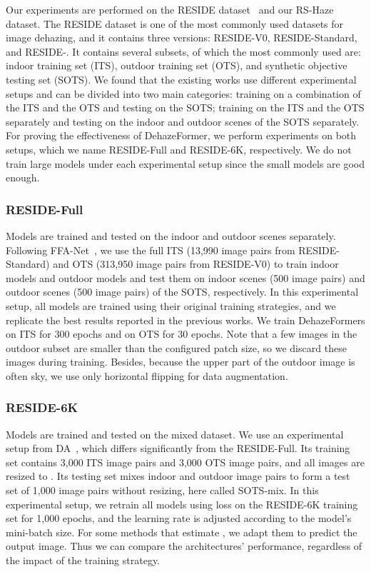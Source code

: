 \documentclass[journal]{IEEEtran}
\begin{document}
Our experiments are performed on the RESIDE dataset~\cite{li2018benchmarking} and our RS-Haze dataset.
The RESIDE dataset is one of the most commonly used datasets for image dehazing, and it contains three versions: RESIDE-V0, RESIDE-Standard, and RESIDE-.
It contains several subsets, of which the most commonly used are: indoor training set (ITS), outdoor training set (OTS), and synthetic objective testing set (SOTS).
We found that the existing works use different experimental setups and can be divided into two main categories: training on a combination of the ITS and the OTS and testing on the SOTS; training on the ITS and the OTS separately and testing on the indoor and outdoor scenes of the SOTS separately.
For proving the effectiveness of DehazeFormer, we perform experiments on both setups, which we name RESIDE-Full and RESIDE-6K, respectively.
We do not train large models under each experimental setup since the small models are good enough.

\subsubsection{RESIDE-Full} 
Models are trained and tested on the indoor and outdoor scenes separately.
Following FFA-Net~\cite{qin2020ffa}, we use the full ITS (13,990 image pairs from RESIDE-Standard) and OTS (313,950 image pairs from RESIDE-V0) to train indoor models and outdoor models and test them on indoor scenes (500 image pairs) and outdoor scenes (500 image pairs) of the SOTS, respectively.
In this experimental setup, all models are trained using their original training strategies, and we replicate the best results reported in the previous works.
We train DehazeFormers on ITS for 300 epochs and on OTS for 30 epochs.
Note that a few images in the outdoor subset are smaller than the configured patch size, so we discard these images during training.
Besides, because the upper part of the outdoor image is often sky, we use only horizontal flipping for data augmentation.

\subsubsection{RESIDE-6K} 
Models are trained and tested on the mixed dataset.
We use an experimental setup from DA~\cite{qin2020ffa}, which differs significantly from the RESIDE-Full.
Its training set contains 3,000 ITS image pairs and 3,000 OTS image pairs, and all images are resized to . 
Its testing set mixes indoor and outdoor image pairs to form a test set of 1,000 image pairs without resizing, here called SOTS-mix.
In this experimental setup, we retrain all models using  loss on the RESIDE-6K training set for 1,000 epochs, and the learning rate is adjusted according to the model's mini-batch size.
For some methods that estimate , we adapt them to predict the output image.
Thus we can compare the architectures' performance, regardless of the impact of the training strategy.
\end{document}
